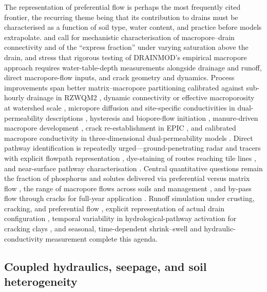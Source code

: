 The representation of preferential flow is perhaps the most frequently cited
frontier, the recurring theme being that its contribution to drains must be
characterised as a function of soil type, water content, and practice before
models extrapolate. \textcite{Gaillot2023} and \textcite{Fox2004} call for
mechanistic characterisation of macropore--drain connectivity and of the
``express fraction'' under varying saturation above the drain, and
\textcite{Askar2020} stress that rigorous testing of DRAINMOD's empirical
macropore approach requires water-table-depth measurements alongside drainage
and runoff, direct macropore-flow inputs, and crack geometry and dynamics.
Process improvements span better matrix--macropore partitioning calibrated
against sub-hourly drainage in RZWQM2 \parencite{Li2023d}, dynamic connectivity
or effective macroporosity at watershed scale \parencite{Poon2021}, micropore
diffusion and site-specific conductivities in dual-permeability descriptions
\parencite{Villholth1998,Villholth1998b}, hysteresis and biopore-flow initiation
\parencite{Holbak2021}, manure-driven macropore development \parencite{Zhao2001},
crack re-establishment in EPIC \parencite{Wang2022}, and calibrated macropore
conductivity in three-dimensional dual-permeability models \parencite{Varvaris2018}.
Direct pathway identification is repeatedly urged---ground-penetrating radar and
tracers with explicit flowpath representation \parencite{Tähtikarhu2025,Salo2017},
dye-staining of routes reaching tile lines \parencite{Nielsen2015}, and
near-surface pathway characterisation \parencite{Frey2012,Allaire2011}. Central
quantitative questions remain the fraction of phosphorus and solutes delivered
via preferential versus matrix flow \parencite{King2015,Williams2016}, the range
of macropore flows across soils and management \parencite{Reid2012}, and by-pass
flow through cracks for full-year application
\parencite{LESAFFRE1988,BACKLUND1995,Ruark2009}. Runoff simulation under
crusting, cracking, and preferential flow \parencite{Smith2020}, explicit
representation of actual drain configuration \parencite{Stamm2002}, temporal
variability in hydrological-pathway activation for cracking clays
\parencite{Kokulan2019}, and seasonal, time-dependent shrink--swell and
hydraulic-conductivity measurement \parencite{Boivin2006,Chelil2022b,Jeantet2021}
complete this agenda.

\subsection{Coupled hydraulics, seepage, and soil heterogeneity}


